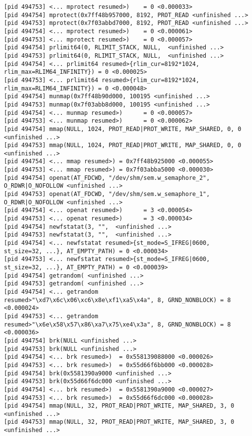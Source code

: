 \documentclass[a4paper, 12pt]{article}
\begin{document}
\begin{lstlisting}
[pid 494753] <... mprotect resumed>)    = 0 <0.000033>
[pid 494754] mprotect(0x7ff48b957000, 8192, PROT_READ <unfinished ...>
[pid 494753] mprotect(0x7f03abbd7000, 8192, PROT_READ <unfinished ...>
[pid 494754] <... mprotect resumed>)    = 0 <0.000061>
[pid 494753] <... mprotect resumed>)    = 0 <0.000057>
[pid 494754] prlimit64(0, RLIMIT_STACK, NULL,  <unfinished ...>
[pid 494753] prlimit64(0, RLIMIT_STACK, NULL,  <unfinished ...>
[pid 494754] <... prlimit64 resumed>{rlim_cur=8192*1024, rlim_max=RLIM64_INFINITY}) = 0 <0.000025>
[pid 494753] <... prlimit64 resumed>{rlim_cur=8192*1024, rlim_max=RLIM64_INFINITY}) = 0 <0.000048>
[pid 494754] munmap(0x7ff48b90d000, 100195 <unfinished ...>
[pid 494753] munmap(0x7f03abb8d000, 100195 <unfinished ...>
[pid 494754] <... munmap resumed>)      = 0 <0.000057>
[pid 494753] <... munmap resumed>)      = 0 <0.000062>
[pid 494754] mmap(NULL, 1024, PROT_READ|PROT_WRITE, MAP_SHARED, 0, 0 <unfinished ...>
[pid 494753] mmap(NULL, 1024, PROT_READ|PROT_WRITE, MAP_SHARED, 0, 0 <unfinished ...>
[pid 494754] <... mmap resumed>) = 0x7ff48b925000 <0.000055>
[pid 494753] <... mmap resumed>) = 0x7f03abba5000 <0.000030>
[pid 494754] openat(AT_FDCWD, "/dev/shm/sem.w_semaphore_2", O_RDWR|O_NOFOLLOW <unfinished ...>
[pid 494753] openat(AT_FDCWD, "/dev/shm/sem.w_semaphore_1", O_RDWR|O_NOFOLLOW <unfinished ...>
[pid 494754] <... openat resumed>)      = 3 <0.000054>
[pid 494753] <... openat resumed>)      = 3 <0.000034>
[pid 494754] newfstatat(3, "",  <unfinished ...>
[pid 494753] newfstatat(3, "",  <unfinished ...>
[pid 494754] <... newfstatat resumed>{st_mode=S_IFREG|0600, st_size=32, ...}, AT_EMPTY_PATH) = 0 <0.000034>
[pid 494753] <... newfstatat resumed>{st_mode=S_IFREG|0600, st_size=32, ...}, AT_EMPTY_PATH) = 0 <0.000039>
[pid 494754] getrandom( <unfinished ...>
[pid 494753] getrandom( <unfinished ...>
[pid 494754] <... getrandom resumed>"\xd7\x6c\x06\xc6\x8e\xf1\xa5\x4a", 8, GRND_NONBLOCK) = 8 <0.000024>
[pid 494753] <... getrandom resumed>"\x6e\x58\x57\x86\xa7\x75\xe4\x3a", 8, GRND_NONBLOCK) = 8 <0.000036>
[pid 494754] brk(NULL <unfinished ...>
[pid 494753] brk(NULL <unfinished ...>
[pid 494754] <... brk resumed>)  = 0x558139088000 <0.000026>
[pid 494753] <... brk resumed>)  = 0x55d66f6bb000 <0.000028>
[pid 494754] brk(0x5581390a9000 <unfinished ...>
[pid 494753] brk(0x55d66f6dc000 <unfinished ...>
[pid 494754] <... brk resumed>)  = 0x5581390a9000 <0.000027>
[pid 494753] <... brk resumed>)  = 0x55d66f6dc000 <0.000028>
[pid 494754] mmap(NULL, 32, PROT_READ|PROT_WRITE, MAP_SHARED, 3, 0 <unfinished ...>
[pid 494753] mmap(NULL, 32, PROT_READ|PROT_WRITE, MAP_SHARED, 3, 0 <unfinished ...>

\end{lstlisting}
\end{document}
